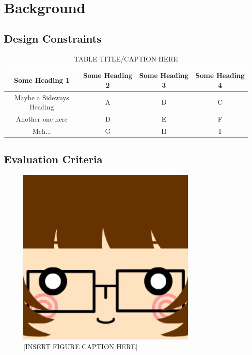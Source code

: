 \documentclass[pdftex,12pt,a4paper]{article}
\begin{document}

\pagebreak
\section{Background}
\subsection{Design Constraints}

\begin{table}[ht]
\caption{TABLE TITLE/CAPTION HERE}
\centering
\begin{tabular}{c c c c} %
\hline %
Some Heading 1 & Some Heading 2 & Some Heading 3 & Some Heading 4 \\ [0.5ex]
\hline
Maybe a Sideways Heading & 	A & B & C \\
Another one here 		 &  D & E & F \\
Meh... 					 &  G & H & I \\ [1ex]	%
\hline
\end{tabular}
\label{table:nonlin}
\end{table}

\subsection{Evaluation Criteria}

\begin{figure}[ht!]
\centering
\includegraphics[width=90mm]{square2.png}
\caption{[INSERT FIGURE CAPTION HERE]}
\label{overflow}
\end{figure}
\end{document}
